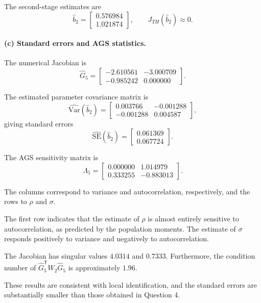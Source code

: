 \documentclass{article}
\begin{document}
The second-stage estimates are
\[
    \widehat b_2
    =
    \begin{bmatrix}
        0.576984\\
        1.021874
    \end{bmatrix},
    \qquad
    J_{TH}(\widehat b_2)\approx0.
\]

\paragraph{(c) Standard errors and AGS statistics.}

The numerical Jacobian is
\[
    \widehat G_5
    =
    \begin{bmatrix}
        -2.610561 & -3.000709\\
        -0.985242 & 0.000000
    \end{bmatrix}.
\]

The estimated parameter covariance matrix is
\[
    \widehat{\mathrm{Var}}(\widehat b_2)
    =
    \begin{bmatrix}
        0.003766 & -0.001288\\
        -0.001288 & 0.004587
    \end{bmatrix},
\]
giving standard errors
\[
    \widehat{\mathrm{SE}}(\widehat b_2)
    =
    \begin{bmatrix}
        0.061369\\
        0.067724
    \end{bmatrix}.
\]

The AGS sensitivity matrix is
\[
    \widehat\Lambda_5
    =
    \begin{bmatrix}
        0.000000 & 1.014979\\
        0.333255 & -0.883013
    \end{bmatrix}.
\]

The columns correspond to variance and autocorrelation,
respectively, and the rows to $\rho$ and $\sigma$.

The first row indicates that the estimate of $\rho$ is
almost entirely sensitive to autocorrelation, as predicted
by the population moments. The estimate of $\sigma$
responds positively to variance and negatively to
autocorrelation.

The Jacobian has singular values $4.0314$ and $0.7333$.
Furthermore, the condition number of
$\widehat G_5^{\mathsf T}W_2\widehat G_5$
is approximately $1.96$.

These results are consistent with local identification,
and the standard errors are substantially smaller than
those obtained in Question 4.
\end{document}
